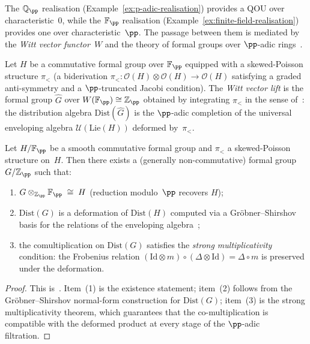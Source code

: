 The $\mathbb{Q}_\pp$ realisation (Example~\ref{ex:p-adic-realisation}) provides
a QOU over characteristic~$0$, while the $\mathbb{F}_\pp$ realisation
(Example~\ref{ex:finite-field-realisation}) provides one over
characteristic~$\pp$.  The passage between them is mediated by the
\emph{Witt vector functor}~$W$ and the theory of formal groups
over $\pp$-adic
rings~\cite{hazewinkel1978,fred2005}.

\begin{definition}
\label{def:witt-vector-lift}
Let $H$ be a commutative formal group over $\mathbb{F}_\pp$ equipped with a
skewed-Poisson structure $\pi_<$
(a biderivation $\pi_<\colon\mathcal{O}(H)\otimes\mathcal{O}(H)\to\mathcal{O}(H)$
satisfying a graded anti-symmetry and a $\pp$-truncated Jacobi condition).
The \emph{Witt vector lift} is the formal group $\widehat{G}$ over
$W(\mathbb{F}_\pp) \cong \mathbb{Z}_\pp$ obtained by integrating $\pi_<$ in the
sense of~\cite{fred2005}: the distribution algebra
$\mathrm{Dist}(\widehat{G})$ is the $\pp$-adic completion of the universal
enveloping algebra $\mathcal{U}(\mathrm{Lie}(H))$ deformed by~$\pi_<$.
\end{definition}

\begin{proposition}
\label{prop:skew-poisson-integration}
Let $H/\mathbb{F}_\pp$ be a smooth commutative formal group and
$\pi_<$ a skewed-Poisson structure on~$H$.  Then there exists a
(generally non-commutative) formal group $G/\mathbb{Z}_\pp$ such that:
\begin{enumerate}
  \item $G \otimes_{\mathbb{Z}_\pp} \mathbb{F}_\pp \;\cong\; H$
        (reduction modulo~$\pp$ recovers $H$);
  \item $\mathrm{Dist}(G)$ is a deformation of
        $\mathrm{Dist}(H)$ computed via a
        Gr\"obner--Shirshov basis for the relations of the enveloping
        algebra~\cite{fred2005};
  \item the comultiplication on $\mathrm{Dist}(G)$ satisfies the
        \emph{strong multiplicativity} condition: the Frobenius relation
        $(\mathrm{Id}\otimes m)\circ(\Delta\otimes\mathrm{Id})
        = \Delta\circ m$ is preserved under the deformation.
\end{enumerate}
\end{proposition}

\begin{proof}
This is~\cite[Main Theorem]{fred2005}.  Item~(1) is the
existence statement; item~(2) follows from the
Gr\"obner--Shirshov normal-form construction for $\mathrm{Dist}(G)$;
item~(3) is the strong multiplicativity theorem, which guarantees
that the co-multiplication is compatible with the deformed product at
every stage of the $\pp$-adic filtration.
\end{proof}

